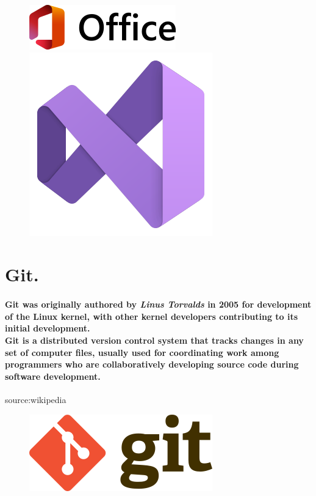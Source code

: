 \documentclass[a4paper,11pt]{report}
\begin{document}
\begin{figure}[!h]
    \centering
    
    \includegraphics[scale=0.9]{img8.png}
    \hspace{1cm}
    \includegraphics[scale=0.25]{img9.png}
    
\end{figure}

\clearpage
\section{Git.}
\paragraph{Git was originally authored by \textit{Linus Torvalds} in 2005 for development of the Linux kernel, with other kernel developers contributing to its initial development.\\Git is a distributed version control system that tracks changes in any set of computer files, usually used for coordinating work among programmers who are collaboratively developing source code during software development.}
\hspace {1cm}
source:wikipedia

    \begin{figure}[!h]
    \centering
    \includegraphics[scale=0.3]{img10.png}
\end{figure}
\end{document}
